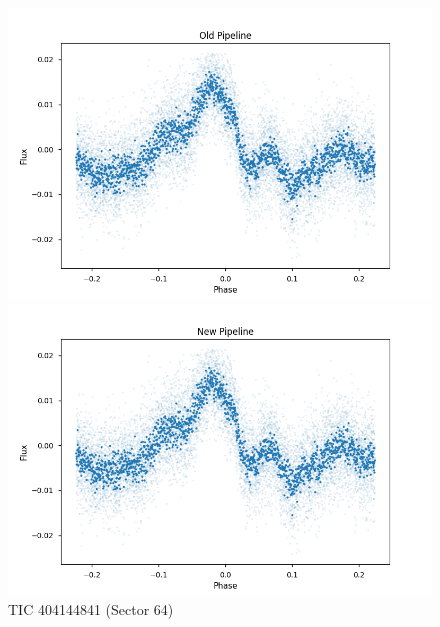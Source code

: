 \documentclass{article}
\begin{document}
\begin{figure}[h!]
    \centering
    \begin{minipage}{0.45\textwidth}
        \centering
        \includegraphics[width=\textwidth]{./figures/7_old.png}
    \end{minipage}%
    \hfill
    \begin{minipage}{0.45\textwidth}
        \centering
        \includegraphics[width=\textwidth]{./figures/7_new.png}
    \end{minipage}
    \caption{TIC 404144841 (Sector 64)}
\end{figure}
\end{document}
